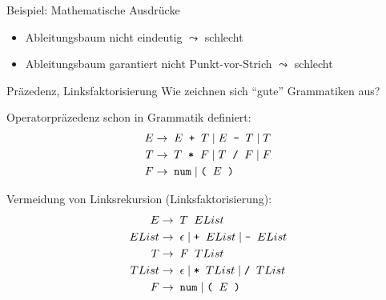 \documentclass{beamer}
\begin{document}
\begin{frame}{Beispiel: Mathematische Ausdrücke}
	\pause

	\begin{itemize}
		\item Ableitungsbaum nicht eindeutig $\leadsto$ schlecht
		\item Ableitungsbaum garantiert nicht Punkt-vor-Strich $\leadsto$ schlecht
	\end{itemize}
\end{frame}

\begin{frame}{Präzedenz, Linksfaktorisierung}
	Wie zeichnen sich \enquote{gute} Grammatiken aus?
	\pause

	Operatorpräzedenz schon in Grammatik definiert:
	\begin{align*}
		E \to & \;\; E \;\; \textrm{\texttt{+}} \;\; T \mid E \;\; \textrm{\texttt{-}} \;\; T \mid T\\
		T \to & \;\; T \;\; \textrm{\texttt{*}} \;\; F \mid T \;\; \textrm{\texttt{/}} \;\; F \mid F\\
		F \to & \;\; \textrm{\texttt{num}} \; | \; \textrm{\texttt{(}} \;\; E \;\; \textrm{\texttt{)}}
	\end{align*}

	\pause

	Vermeidung von Linksrekursion (Linksfaktorisierung):
	\begin{align*}
		E     \to & \;\; T \;\; EList\\
		EList \to & \;\; \epsilon \mid \textrm{\texttt{+}} \;\; EList \mid \textrm{\texttt{-}} \;\; EList\\
		T     \to & \;\; F \;\; TList\\
		TList \to & \;\; \epsilon \mid \textrm{\texttt{*}} \;\; TList \mid \textrm{\texttt{/}} \;\; TList\\
		F \to & \;\; \textrm{\texttt{num}} \; | \; \textrm{\texttt{(}} \;\; E \;\; \textrm{\texttt{)}}
	\end{align*}
\end{frame}
\end{document}
